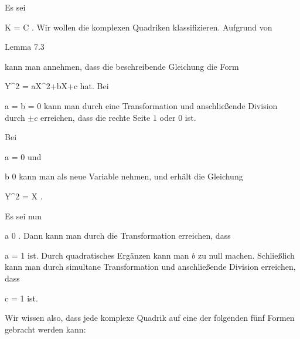{





Es sei

\mavergleichskette
{\vergleichskette
{ K
}
{ = }{ {\mathbb C}
}
{  }{
}
{    }{
}
{   }{
}
}
{}{}{.}
Wir wollen die komplexen Quadriken klassifizieren. Aufgrund von

Lemma 7.3

kann man annehmen, dass die beschreibende Gleichung die Form

\mavergleichskettedisp
{\vergleichskette
{ Y^2
}
{ =} { aX^2+bX+c
}
{ } {
}
{ } {
}
{ } {
}
}
{}{}{}
hat. Bei

\mavergleichskette
{\vergleichskette
{ a
}
{ = }{ b
}
{ = }{ 0
}
{    }{
}
{   }{
}
}
{}{}{}
kann man durch eine Transformation
 und anschließende Division durch $\pm c$ erreichen, dass die rechte Seite $1$ oder $0$ ist.

Bei

\mavergleichskette
{\vergleichskette
{ a
}
{ = }{ 0
}
{  }{
}
{    }{
}
{   }{
}
}
{}{}{}
und

\mavergleichskette
{\vergleichskette
{ b
}
{ \neq }{ 0
}
{  }{
}
{    }{
}
{   }{
}
}
{}{}{}
kann man
 als neue Variable nehmen, und erhält die Gleichung

\mavergleichskette
{\vergleichskette
{ Y^2
}
{ = }{ X
}
{  }{
}
{    }{
}
{   }{
}
}
{}{}{.}

Es sei nun

\mavergleichskette
{\vergleichskette
{ a
}
{ \neq }{ 0
}
{  }{
}
{    }{
}
{   }{
}
}
{}{}{.}
Dann kann man durch die Transformation
 erreichen, dass

\mavergleichskette
{\vergleichskette
{ a
}
{ = }{ 1
}
{  }{
}
{    }{
}
{   }{
}
}
{}{}{}
ist. Durch quadratisches Ergänzen kann man $b$ zu null machen. Schließlich kann man durch simultane Transformation
 und anschließende Division erreichen, dass

\mavergleichskette
{\vergleichskette
{ c
}
{ = }{ 1
}
{  }{
}
{    }{
}
{   }{
}
}
{}{}{}
ist.

Wir wissen also, dass jede komplexe Quadrik auf eine der folgenden fünf Formen gebracht werden kann:
}
